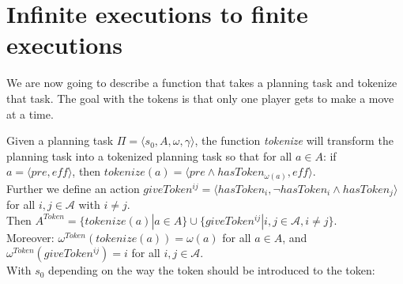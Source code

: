 \section{Infinite executions to finite executions}

We are now going to describe a function that takes a planning task and tokenize that task. The goal with the tokens is that only one player gets to make a move at a time.

Given a planning task $\Pi = \langle s_0, A, \omega, \gamma \rangle $, the function \textit{tokenize} will transform the planning task into a tokenized planning task so that for all $a \in A$:
 if $a = \langle pre, \textit{eff} \rangle$, then
   $tokenize(a) =\langle pre \wedge hasToken_{\omega(a)}, \textit{eff} \rangle$. \\
Further we define an action
    $ giveToken^{ij} = \langle hasToken_i, \neg hasToken_i \wedge hasToken_j \rangle $
    for all $i,j \in \mathcal{A}$ with $i \not = j$. \\
Then $ A^{Token}=\{tokenize(a)|a \in A\} \cup \{giveToken^{ij}|i,j \in \mathcal{A}, i \not = j\}$. \\
Moreover: $\omega^{Token}(tokenize(a))= \omega(a)$ for all $a \in A$,
and $\omega^{Token}(giveToken^{ij}) = i$ for all $i,j \in \mathcal{A}$. \\
With $s_0$ depending on the way the token should be introduced to the token:

